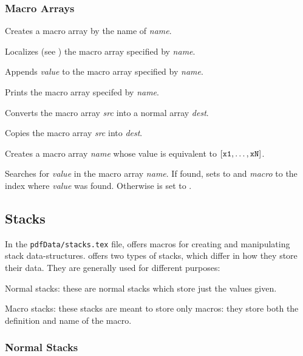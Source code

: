 \subsubsection{Macro Arrays}

Creates a macro array by the name of {\it name}.
\emacroexp

Localizes (see ) the macro array specified by {\it name}.
\emacroexp

Appends {\it value} to the macro array specified by {\it name}.
\emacroexp

Prints the macro array specifed by {\it name}.
\emacroexp

Converts the macro array {\it src} into a normal array {\it dest}.
\emacroexp

Copies the macro array {\it src} into {\it dest}.
\emacroexp

Creates a macro array {\it name} whose value is equivalent to $\tt[x1,\dots,xN]$.
\emacroexp

Searches for {\it value} in the macro array {\it name}.
If found, sets \macro\@return@value{} to \macro\True{} and {\it macro} to the index where {\it value} was found.
Otherwise \macro\@return@value{} is set to \macro\False.
\emacroexp

\subsection{Stacks}

In the {\tt pdfData/stacks.tex} file, \pdftoolbox{} offers macros for creating and manipulating stack data-structures.
\pdftoolbox{} offers two types of stacks, which differ in how they store their data.
They are generally used for different purposes:

\blist
    \item Normal stacks: these are normal stacks which store just the values given.
    \item Macro stacks: these stacks are meant to store only macros: they store both the definition and name of the macro.
\elist

\subsubsection{Normal Stacks}

